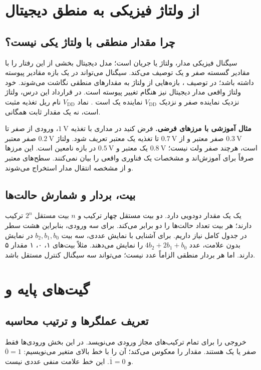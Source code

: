 \section{از ولتاژ فیزیکی به منطق دیجیتال}
\subsection{چرا مقدار منطقی با ولتاژ یکی نیست؟}
سیگنال فیزیکی مدار، ولتاژ یا جریان است؛ مدل دیجیتال بخشی از این رفتار را با
مقادیر گسسته صفر و یک توصیف می‌کند. سیگنال  می‌تواند در یک بازه
مقادیر پیوسته داشته باشد؛ در توصیف ، بازه‌هایی از ولتاژ به مقدارهای
منطقی نگاشت می‌شوند. خود ولتاژ واقعی مدار دیجیتال نیز هنگام تغییر پیوسته است.
در قرارداد این درس، ولتاژ نزدیک  نماینده صفر و نزدیک
\(V_{\mathrm{DD}}\) نماینده یک است \cite[بخش ]{weste}.
نماد \(V_{\mathrm{DD}}\) نام ریل تغذیه مثبت است، نه یک مقدار ثابت همگانی.

\textbf{مثال آموزشی با مرزهای فرضی.} فرض کنید در مداری با تغذیه
\(\qty{1}{\volt}\)، ورودی از صفر تا \(\qty{0.3}{\volt}\) صفر معتبر و
از \(\qty{0.7}{\volt}\) تا تغذیه یک معتبر تعریف شود.
ولتاژ \(\qty{0.2}{\volt}\) صفر معتبر است، هرچند صفر ولت نیست؛
\(\qty{0.8}{\volt}\) یک معتبر و \(\qty{0.5}{\volt}\) در بازه نامعین است.
این مرزها صرفاً برای آموزش‌اند و مشخصات یک فناوری واقعی را بیان نمی‌کنند.
سطح‌های معتبر و  از
مشخصه انتقال مدار استخراج می‌شوند.

\subsection{بیت، بردار و شمارش حالت‌ها}
یک  یک مقدار دودویی دارد. دو بیت مستقل چهار ترکیب و \(n\) بیت مستقل
\(2^n\) ترکیب دارند؛ هر بیت تعداد حالت‌ها را دو برابر می‌کند.
برای سه ورودی، بنابراین هشت سطر در جدول کامل نیاز داریم.
برای آشنایی با نمایش عددی، سه بیت \(b_2,b_1,b_0\) در نمایش بدون علامت، عدد
\(4b_2+2b_1+b_0\) را نمایش می‌دهند. مثلاً بیت‌های ۱، ۰، ۱ مقدار ۵ دارند.
اما هر بردار منطقی الزاماً عدد نیست؛ می‌تواند سه سیگنال کنترل مستقل باشد.

\section{گیت‌های پایه و }
\subsection{تعریف عملگرها و ترتیب محاسبه}
 خروجی را برای تمام ترکیب‌های مجاز ورودی می‌نویسد.
در این بخش ورودی‌ها فقط صفر یا یک هستند.
 مقدار را معکوس می‌کند؛ آن را با خط بالای متغیر می‌نویسیم:
\(\overline{0}=1\) و \(\overline{1}=0\).
این خط علامت منفی عددی نیست.

